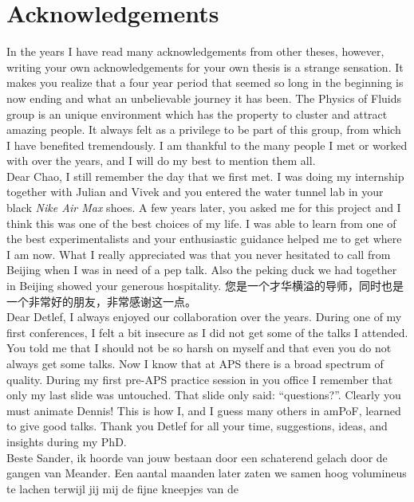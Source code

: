 \chapter{Acknowledgements}
\mf{\flagus}\indent In the years I have read many acknowledgements from other
theses, however, writing your own acknowledgements for your own thesis is a
strange sensation.  It makes you realize that a four year period that seemed
so long in the beginning is now ending and what an unbelievable journey it has
been.  The Physics of Fluids group is an unique environment which has the
property to cluster and attract amazing people.  It always felt as a privilege
to be part of this group, from which I have benefited tremendously.  I am
thankful to the many people I met or worked with over the years, and I will do
my best to mention them all. \\
\indent Dear Chao, I still remember the day that we first met. I
was doing my internship together with Julian and Vivek and you entered the
water tunnel lab in your black \emph{Nike Air Max} shoes. A few years later,
you asked me for this project and I think this was one of the best choices of
my life. I was able to learn from one of the best experimentalists 
and your enthusiastic guidance helped me to get where I am now. What I
really appreciated was that you never hesitated to call from Beijing when I
was in need of a pep talk. Also the peking duck we had together in Beijing
showed your generous hospitality. \mf{\flagcn} 您是一个才华横溢的导师，同时也是一个非常好的朋友，非常感谢这一点。\\
\mf{\flagus}\indent Dear Detlef, I always enjoyed our collaboration over the
years. During one of my first conferences, I felt a bit insecure as I did not
get some of the talks I attended. You told me that I should not be so harsh on
myself and that even you do not always get some talks. Now I know that at APS
there is a broad spectrum of quality. During my first pre-APS practice session
in you office I remember that only my last slide was untouched. That slide
only said: ``questions?''. Clearly you must animate Dennis! This is how I, and
I guess many others in amPoF, learned to give good talks. Thank you Detlef for
all your time, suggestions, ideas, and insights during my PhD.\\
\mf{\flagnl}\indent Beste Sander, ik hoorde van jouw bestaan door een
schaterend gelach door de gangen van Meander. Een aantal maanden later zaten
we samen hoog volumineus te lachen terwijl jij mij de fijne kneepjes van de
